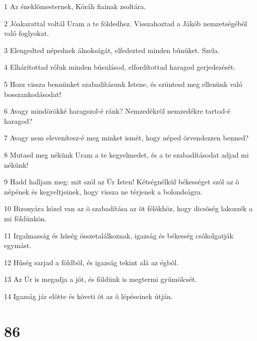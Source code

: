 \par 1 Az éneklõmesternek, Kóráh fiainak zsoltára.
\par 2 Jóakarattal voltál Uram a te földedhez. Visszahoztad a Jákób nemzetségébõl való foglyokat.
\par 3 Elengedted népednek álnokságát, elfedezted minden bûnüket. Szela.
\par 4 Elhárítottad róluk minden búsulásod, elfordítottad haragod gerjedezését.
\par 5 Hozz vissza bennünket szabadításunk Istene, és szüntesd meg ellenünk való bosszankodásodat!
\par 6 Avagy mindörökké haragszol-é ránk? Nemzedékrõl nemzedékre tartod-é haragod?
\par 7 Avagy nem elevenítesz-é meg minket ismét, hogy néped örvendezzen benned?
\par 8 Mutasd meg nékünk Uram a te kegyelmedet, és a te szabadításodat adjad mi nékünk!
\par 9 Hadd halljam meg: mit szól az Úr Isten! Kétségnélkül békességet szól az õ népének és kegyeltjeinek, hogy vissza ne térjenek a bolondságra.
\par 10 Bizonyára közel van az õ szabadítása az õt félõkhöz, hogy dicsõség lakozzék a mi földünkön.
\par 11 Irgalmasság és hûség összetalálkoznak, igazság és békesség csókolgatják egymást.
\par 12 Hûség sarjad a földbõl, és igazság tekint alá az égbõl.
\par 13 Az Úr is megadja a jót, és földünk is megtermi gyümölcsét.
\par 14 Igazság jár elõtte és követi õt az õ lépéseinek útján.

\chapter{86}

